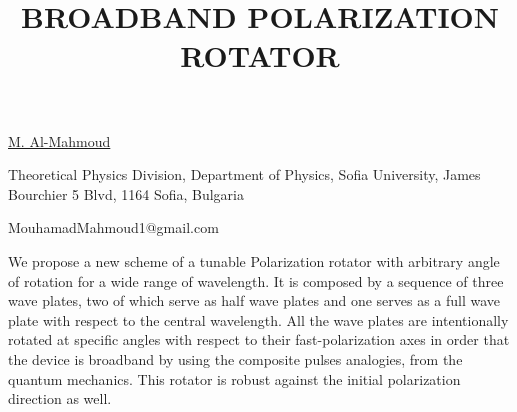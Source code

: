 \title{BROADBAND POLARIZATION ROTATOR}

\underline{M. Al-Mahmoud}  

{\normalsize{\vspace{-4mm}
Theoretical Physics Division,
Department of Physics, Sofia University,
James Bourchier 5 Blvd, 1164 Sofia, Bulgaria



\email MouhamadMahmoud1@gmail.com}}

We propose a new scheme of a tunable Polarization rotator with arbitrary angle of rotation for a wide range of wavelength. It is composed by a sequence of three wave plates, two of which serve as half wave plates and one serves as a full wave plate with respect to the central wavelength. All the wave plates are intentionally rotated at specific angles with respect to their fast-polarization axes in order that the device is broadband by using the composite pulses analogies, from the quantum mechanics. This rotator is robust against the initial polarization direction as well. 

\vspace{\baselineskip}
